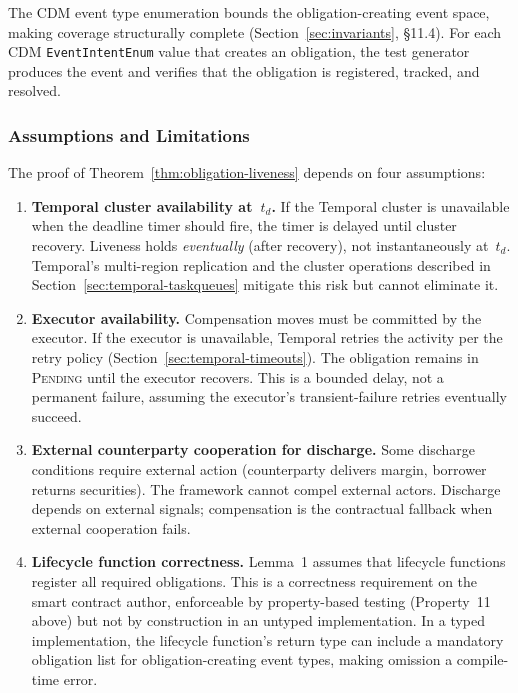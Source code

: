 \documentclass[11pt,a4paper]{article}
\begin{document}
\noindent The CDM event type enumeration bounds the obligation-creating event space, making coverage structurally complete (Section~\ref{sec:invariants}, \S11.4). For each CDM \texttt{EventIntentEnum} value that creates an obligation, the test generator produces the event and verifies that the obligation is registered, tracked, and resolved.

\subsubsection{Assumptions and Limitations}
\label{sec:obligation-limitations}

The proof of Theorem~\ref{thm:obligation-liveness} depends on four assumptions:

\begin{enumerate}
\item \textbf{Temporal cluster availability at~$t_d$.} If the Temporal cluster is unavailable when the deadline timer should fire, the timer is delayed until cluster recovery. Liveness holds \emph{eventually} (after recovery), not instantaneously at~$t_d$. Temporal's multi-region replication and the cluster operations described in Section~\ref{sec:temporal-taskqueues} mitigate this risk but cannot eliminate it.

\item \textbf{Executor availability.} Compensation moves must be committed by the executor. If the executor is unavailable, Temporal retries the activity per the retry policy (Section~\ref{sec:temporal-timeouts}). The obligation remains in \textsc{Pending} until the executor recovers. This is a bounded delay, not a permanent failure, assuming the executor's transient-failure retries eventually succeed.

\item \textbf{External counterparty cooperation for discharge.} Some discharge conditions require external action (counterparty delivers margin, borrower returns securities). The framework cannot compel external actors. Discharge depends on external signals; compensation is the contractual fallback when external cooperation fails.

\item \textbf{Lifecycle function correctness.} Lemma~1 assumes that lifecycle functions register all required obligations. This is a correctness requirement on the smart contract author, enforceable by property-based testing (Property~11 above) but not by construction in an untyped implementation. In a typed implementation, the lifecycle function's return type can include a mandatory obligation list for obligation-creating event types, making omission a compile-time error.
\end{enumerate}
\end{document}
